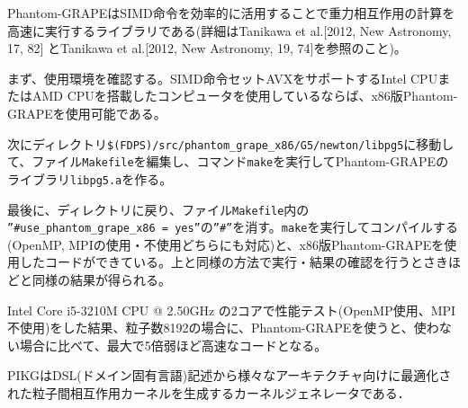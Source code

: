 

\label{s3sec:phantom_grape_x86}
Phantom-GRAPEはSIMD命令を効率的に活用することで重力相互作用の計算を高速に実行するライブラリである(詳細はTanikawa et al.[2012, New Astronomy, 17, 82] とTanikawa et al.[2012, New Astronomy, 19, 74]を参照のこと)。

まず、使用環境を確認する。SIMD命令セットAVXをサポートするIntel CPUまたはAMD CPUを搭載したコンピュータを使用しているならば、x86版Phantom-GRAPEを使用可能である。

次にディレクトリ\texttt{\$(FDPS)/src/phantom\_grape\_x86/G5/newton/libpg5}に移動して、ファイル\texttt{Makefile}を編集し、コマンド\texttt{make}を実行してPhantom-GRAPEのライブラリ\texttt{libpg5.a}を作る。

最後に、ディレクトリ\dirNameNbodySample に戻り、ファイル\texttt{Makefile}内の\texttt{\\''\#use\_phantom\_grape\_x86 = yes''}の\texttt{''\#''}を消す。\texttt{make}を実行してコンパイルする(OpenMP, MPIの使用・不使用どちらにも対応)と、x86版Phantom-GRAPEを使用したコードができている。上と同様の方法で実行・結果の確認を行うとさきほどと同様の結果が得られる。

Intel Core i5-3210M CPU @ 2.50GHz の2コアで性能テスト(OpenMP使用、MPI不使用)をした結果、粒子数8192の場合に、Phantom-GRAPEを使うと、使わない場合に比べて、最大で5倍弱ほど高速なコードとなる。

\label{s3sec:pikg_x86}
PIKGはDSL(ドメイン固有言語)記述から様々なアーキテクチャ向けに最適化された粒子間相互作用カーネルを生成するカーネルジェネレータである．

